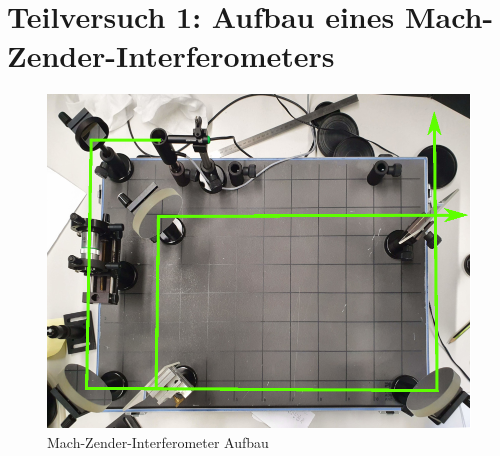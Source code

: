 \section{Teilversuch 1: Aufbau eines Mach-Zender-Interferometers}
	\begin{figure}[H]
		\centering
		\includegraphics[width=\textwidth]{images/setup.eps}
		\caption{\centering Mach-Zender-Interferometer Aufbau}
		\label{fig:mzi-setup}
		\vspace{-1em}
	\end{figure}
